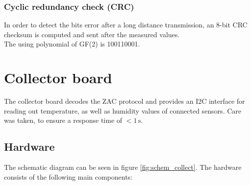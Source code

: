 \documentclass[a4paper]{scrreprt}
\begin{document}
\subsubsection{Cyclic redundancy check (CRC)}
In order to detect the bits error after a long distance transmission, 
an 8-bit CRC checksum is computed and sent after the measured values. \\
The using polynomial of GF(2) is 100110001.
\section{Collector board}
The collector board decodes the ZAC protocol and provides an I2C interface for
reading out temperature, as well as humidity values of connected sensors.
Care was taken, to ensure a response time of $<1\,\mathrm{s}$.
\subsection{Hardware}
The schematic diagram can be seen in figure \ref{fig:schem_collect}. The hardware consists of the following main components:
\end{document}
